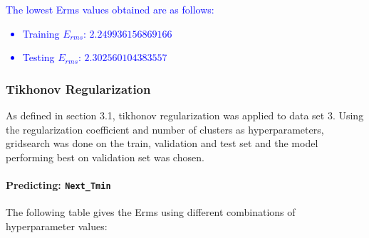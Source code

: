 \documentclass[12pt,a4paper]{article}
\newcommand{\noi}{\noindent}
\def\tt#1{\texttt{#1}}
\begin{document}
\noi
\textcolor{blue}{
The lowest Erms values obtained are as follows:
\begin{itemize}
    \itemsep0em
    \item Training $E_{rms}$: $2.249936156869166$
    \item Testing $E_{rms}$: $2.302560104383557$
\end{itemize}
}

\subsubsection{Tikhonov Regularization} 
As defined in section 3.1, tikhonov regularization was applied to data set 3. Using the regularization coefficient and number of clusters as hyperparameters, gridsearch was done on the train, validation and test set and the model performing best on validation set was chosen. 
\paragraph{Predicting: \tt{Next\_Tmin}}
The following table gives the Erms using different combinations of hyperparameter values:
\end{document}
